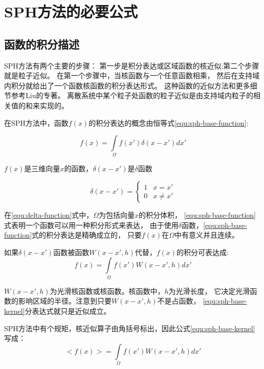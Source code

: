 \section{SPH方法的必要公式}
\label{sec:sph-base-equ}

\subsection{函数的积分描述}
\label{subsec:fun-int-equ}

SPH方法有两个主要的步骤：
第一步是积分表达或区域函数的核近似;第二个步骤就是粒子近似。
在第一个步骤中，当核函数与一个任意函数相乘，
然后在支持域内积分就给出了一个函数核函数的积分表达形式。
这种函数的近似方法和更多细节参考Liu的专著。
离散系统中某个粒子处函数的粒子近似是由支持域内粒子的相关值的和来实现的。

在SPH方法中，函数$f(x)$的积分表达的概念由恒等式\ref{equ:sph-base-function}:

\begin{equation}
\label{equ:sph-base-function}
f(x) = \int\limits_\Omega{}f(x')\delta(x-x')dx'
\end{equation}

$f(x)$是三维向量$x$的函数，$\delta(x-x')$是$\delta$函数

\begin{equation}
\label{equ:delta-function}
\delta(x-x') = \left\{
\begin{array}{rl}
1 & x = x'\\
0 & x \ne x' 
\end{array} \right.
\end{equation}

在\ref{equ:delta-function}式中，$\Omega$为包括向量$x$的积分体积，
\ref{equ:sph-base-function}式表明一个函数可以用一种积分形式来表达，
由于使用$\delta$函数，\ref{equ:sph-base-function}式的积分表达是精确成立的，
只要$f(x)$在$\Omega$中有意义并且连续。

如果$\delta(x-x')$函数被函数$W(x-x',h)$代替，$f(x)$的积分可表达成:
\begin{equation}
\label{equ:sph-base-kernel}
f(x)=\int\limits_\Omega{}f(x')W(x-x',h)dx'
\end{equation}

$W(x-x',h)$为光滑核函数或核函数。核函数中，$h$为光滑长度，
它决定光滑函数的影响区域的半径。注意到只要$W(x-x',h)$不是占函数，
\ref{equ:sph-base-kernel}分表达式就只是近似成立。

SPH方法中有个规矩，核近似算子由角括号标出，因此公式\ref{equ:sph-base-kernel}写成：
\begin{equation}
\label{equ:sph-base-kernel:s}
< f(x) >=\int\limits_\Omega{}f(x')W(x-x',h)dx'
\end{equation}

